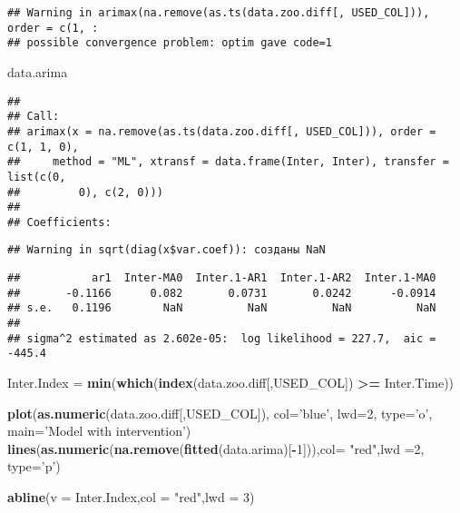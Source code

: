 \documentclass[
]{article}
\newenvironment{Shaded}{\begin{snugshade}}{\end{snugshade}}
\newcommand{\DataTypeTok}[1]{\textcolor[rgb]{0.13,0.29,0.53}{#1}}
\newcommand{\DecValTok}[1]{\textcolor[rgb]{0.00,0.00,0.81}{#1}}
\newcommand{\KeywordTok}[1]{\textcolor[rgb]{0.13,0.29,0.53}{\textbf{#1}}}
\newcommand{\NormalTok}[1]{#1}
\newcommand{\OperatorTok}[1]{\textcolor[rgb]{0.81,0.36,0.00}{\textbf{#1}}}
\newcommand{\StringTok}[1]{\textcolor[rgb]{0.31,0.60,0.02}{#1}}
\begin{document}
\begin{verbatim}
## Warning in arimax(na.remove(as.ts(data.zoo.diff[, USED_COL])), order = c(1, :
## possible convergence problem: optim gave code=1
\end{verbatim}

\begin{Shaded}
\begin{Highlighting}[]
\NormalTok{data.arima}
\end{Highlighting}
\end{Shaded}

\begin{verbatim}
## 
## Call:
## arimax(x = na.remove(as.ts(data.zoo.diff[, USED_COL])), order = c(1, 1, 0), 
##     method = "ML", xtransf = data.frame(Inter, Inter), transfer = list(c(0, 
##         0), c(2, 0)))
## 
## Coefficients:
\end{verbatim}

\begin{verbatim}
## Warning in sqrt(diag(x$var.coef)): созданы NaN
\end{verbatim}

\begin{verbatim}
##           ar1  Inter-MA0  Inter.1-AR1  Inter.1-AR2  Inter.1-MA0
##       -0.1166      0.082       0.0731       0.0242      -0.0914
## s.e.   0.1196        NaN          NaN          NaN          NaN
## 
## sigma^2 estimated as 2.602e-05:  log likelihood = 227.7,  aic = -445.4
\end{verbatim}

\begin{Shaded}
\begin{Highlighting}[]
\NormalTok{Inter.Index =}\StringTok{ }\KeywordTok{min}\NormalTok{(}\KeywordTok{which}\NormalTok{(}\KeywordTok{index}\NormalTok{(data.zoo.diff[,USED_COL]) }\OperatorTok{>=}\StringTok{ }\NormalTok{Inter.Time))}

\KeywordTok{plot}\NormalTok{(}\KeywordTok{as.numeric}\NormalTok{(data.zoo.diff[,USED_COL]), }\DataTypeTok{col=}\StringTok{'blue'}\NormalTok{, }\DataTypeTok{lwd=}\DecValTok{2}\NormalTok{, }\DataTypeTok{type=}\StringTok{'o'}\NormalTok{, }\DataTypeTok{main=}\StringTok{'Model with intervention'}\NormalTok{)}
\KeywordTok{lines}\NormalTok{(}\KeywordTok{as.numeric}\NormalTok{(}\KeywordTok{na.remove}\NormalTok{(}\KeywordTok{fitted}\NormalTok{(data.arima)[}\OperatorTok{-}\DecValTok{1}\NormalTok{])),}\DataTypeTok{col=} \StringTok{"red"}\NormalTok{,}\DataTypeTok{lwd =}\DecValTok{2}\NormalTok{, }\DataTypeTok{type=}\StringTok{'p'}\NormalTok{)}

\KeywordTok{abline}\NormalTok{(}\DataTypeTok{v =}\NormalTok{ Inter.Index,}\DataTypeTok{col =} \StringTok{"red"}\NormalTok{,}\DataTypeTok{lwd =} \DecValTok{3}\NormalTok{)}
\end{Highlighting}
\end{Shaded}
\end{document}
